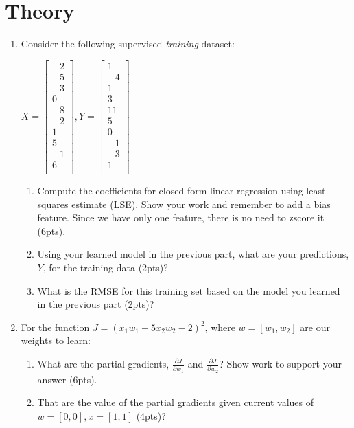 \documentclass[12pt]{article}
\begin{document}
\section{Theory}
\begin{enumerate}
\item  Consider the following supervised \emph{training} dataset:\\
\begin{center}
$X=
 \begin{bmatrix}
	-2\\
	-5\\	
	-3\\
	0\\
	-8\\
	-2\\
	1\\
	5\\
	-1\\
	6\\
\end{bmatrix},
Y=
 \begin{bmatrix}
	1\\
	-4\\	
	1\\
	3\\
	11\\
	5\\
	0\\
	-1\\
	-3\\
	1\\
\end{bmatrix}
$
\end{center}
\begin{enumerate}
\item Compute the coefficients for closed-form linear regression using least squares estimate (LSE).  Show your work and remember to add a bias feature.  Since we have only one feature, there is no need to zscore it (6pts).
\item Using your learned model in the previous part, what are your predictions, $Y$, for the training data (2pts)?
\item What is the RMSE for this training set based on the model you learned in the previous part (2pts)?
\end{enumerate} 

	
\item For the function $J=(x_1 w_1 -5x_2 w_2-2)^2$, where $w=[w_1, w_2]$ are our weights to learn:
\begin{enumerate}
\item What are the partial gradients, $\frac{\partial J}{\partial w_1}$ and $\frac{\partial J}{\partial w_2}$?  Show work to support your answer (6pts).
\item That are the value of the partial gradients given current values of $w=[0, 0], x=[1, 1]$ (4pts)?
\end{enumerate}

\end{enumerate}
\end{document}

